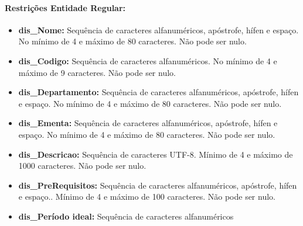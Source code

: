 \documentclass{report}
\begin{document}
\paragraph{Restrições Entidade Regular:}
\begin{itemize}
  \item \textbf{dis\_Nome:} Sequência de caracteres alfanuméricos, apóstrofe, hífen e espaço. No mínimo de 4 e máximo de 80 caracteres. Não pode ser nulo.
  \item \textbf{dis\_Codigo:}  Sequência de caracteres alfanuméricos. No mínimo de 4 e máximo de 9 caracteres. Não pode ser nulo.
  \item \textbf{dis\_Departamento:} Sequência de caracteres alfanuméricos, apóstrofe, hífen e espaço. No mínimo de 4 e máximo de 80 caracteres. Não pode ser nulo.
  \item \textbf{dis\_Ementa:} Sequência de caracteres alfanuméricos, apóstrofe, hífen e espaço. No mínimo de 4 e máximo de 80 caracteres. Não pode ser nulo.
  \item \textbf{dis\_Descricao:} Sequência de caracteres UTF-8. Mínimo de 4 e máximo de 1000 caracteres. Não pode ser nulo.
  \item \textbf{dis\_PreRequisitos:} Sequência de caracteres alfanuméricos, apóstrofe, hífen e espaço.. Mínimo de 4 e máximo de 100 caracteres. Não pode ser nulo.
  \item \textbf{dis\_Período ideal:} Sequência de caracteres alfanuméricos
\end{itemize}
\end{document}

